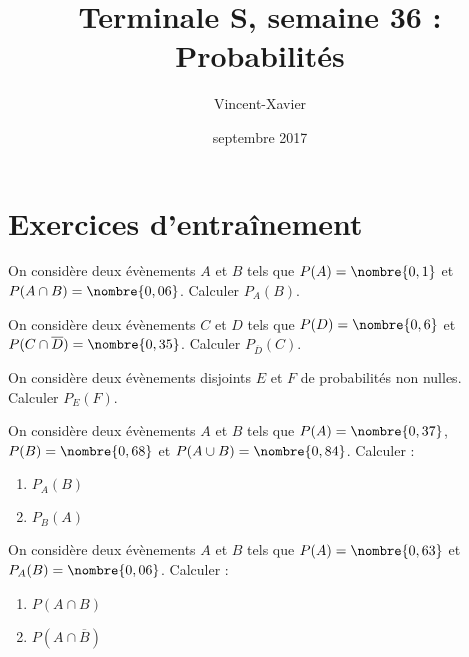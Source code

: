 \documentclass[12pt,a4paper,french]{article}
\author{Vincent-Xavier \bsc{Jumel}}
\title{Terminale S, semaine 36 : Probabilités}
\date{septembre 2017}
\begin{document}
\maketitle

\newpage

\section{Exercices d'entraînement}

\begin{question}On considère deux évènements $A$ et $B$ tels que $P(A)=\nombre{0,1}$ et $P(A\cap B)=\nombre{0,06}$.
  Calculer $P_A(B)$.
\end{question}


\begin{question}On considère deux évènements $C$ et $D$ tels que $P(D)=\nombre{0,6}$ et $P(C\cap \overline{D})=\nombre{0,35}$.
  Calculer $P_{\overline{D}}(C)$.
\end{question}

\begin{question}On considère deux évènements disjoints $E$ et $F$ de probabilités non nulles.
  Calculer $P_E(F)$.

\end{question}


\begin{question}On considère deux évènements $A$ et $B$ tels que $P(A)=\nombre{0,37}$, $P(B)=\nombre{0,68}$  et $P(A\cup B)=\nombre{0,84}$.
  Calculer :
  \begin{enumerate}
  \item $P_A(B)$
  \item $P_B(A)$
  \end{enumerate}
\end{question}


\begin{question}On considère deux évènements $A$ et $B$ tels que $P(A)=\nombre{0,63}$ et $P_A(B)=\nombre{0,06}$. Calculer :
  \begin{enumerate}
  \item $P(A\cap B)$
  \item $P\left(A\cap \overline{B}\right)$
  \end{enumerate}
\end{question}
\end{document}
